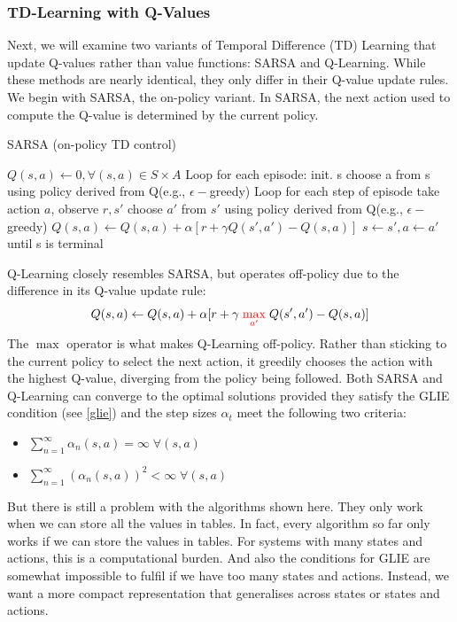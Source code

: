 \subsubsection{TD-Learning with Q-Values}\label{sarsa and q learning}
Next, we will examine two variants of Temporal Difference (TD) Learning that update 
Q-values rather than value functions: SARSA and Q-Learning. While these methods are 
nearly identical, they only differ in their Q-value update rules.\newline
We begin with SARSA, the on-policy variant. In SARSA, the next action used to compute
the Q-value is determined by the current policy.
\begin{algorithm}[H]
  \large
    \caption{SARSA (on-policy TD control)}\label{Sarsa}
    \begin{algorithmic}
        \STATE $Q(s,a)\gets 0, \forall (s,a) \in S \times A$
        \STATE Loop for each episode:
        \STATE \quad init. s
        \STATE \quad choose a from s using policy derived from Q(e.g., $\epsilon-$greedy)
        \STATE \quad Loop for each step of episode
        \STATE \qquad take action $a$, observe $r,s'$ 
        \STATE \qquad choose $a'$ from $s'$ using policy derived from Q(e.g., $\epsilon-$greedy)
        \STATE \qquad $Q(s,a) \gets Q(s,a) + \alpha[r+\gamma Q(s',a')-Q(s,a)] $
        \STATE \qquad $s \gets s',a \gets a'$
        \STATE \quad until s is terminal
    \end{algorithmic}
\end{algorithm}
Q-Learning closely resembles SARSA, but operates off-policy due to the difference in 
its Q-value update rule:
$$Q(s,a) \gets Q(s,a) + \alpha[r+\gamma \;{\color{red}\max\limits_{a'}}\;Q(s',a')-Q(s,a)] $$
The $\max$ operator is what makes Q-Learning off-policy. Rather than sticking to the current 
policy to select the next action, it greedily chooses the action with the highest Q-value, 
diverging from the policy being followed. Both SARSA and Q-Learning can converge to the optimal solutions 
provided they satisfy the GLIE condition (see \ref{glie}) and the step sizes $\alpha_t$ meet the following two
criteria:
\begin{itemize}\label{robbins munro}
\item $\sum_{n=1}^{\infty} \alpha_n(s,a) = \infty \;\forall (s,a)$
\item $\sum_{n=1}^{\infty} (\alpha_n(s,a))^2 < \infty \;\forall (s,a)$
\end{itemize}
But there is still a problem with the algorithms shown here. They only work when
we can store all the values in tables. In fact, every algorithm so far only works if 
we can store the values in tables. For systems with many states and actions, this is 
a computational burden. And also the conditions for GLIE are somewhat impossible to 
fulfil if we have too many states and actions. Instead, we want a more compact 
representation that generalises across states or states and actions.

